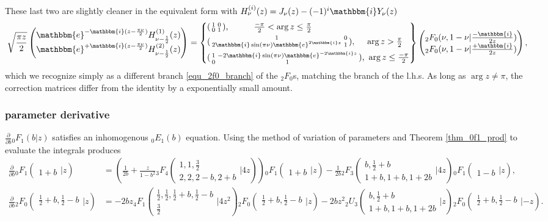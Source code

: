 \documentclass[12pt]{article}
\newcommand{\ee}[0] {\mathbbm{e}}
\newcommand{\ii}[0] {\mathbbm{i}}
\numberwithin{equation}{section}
\newcommand{\Head}[3] {{}_{#1}{#2}_{#3}}
\newcommand{\ArgS}[3] {( \begin{smallmatrix} #1 \\ #2 \end{smallmatrix} | {#3})}
\begin{document}
These last two are slightly cleaner in the equivalent form with $H_{\nu}^{(i)}(z) = J_{\nu}(z) - (-1)^i \ii Y_{\nu}(z)$
\begin{equation*}
\sqrt{\frac{\pi z}{2}} \begin{pmatrix}
\ee^{-\ii (z - \frac{\pi \nu}{2})}H_{\nu-\frac{1}{2}}^{(1)}(z)\\
\ee^{+\ii (z - \frac{\pi \nu}{2})}H_{\nu-\frac{1}{2}}^{(2)}(z)
\end{pmatrix}
=
\left\{
\begin{aligned}
&(\begin{smallmatrix} 1&0\\ 0 &1\end{smallmatrix})\text{,} \quad \quad \quad \tfrac{-\pi}{2} < \arg z \le \tfrac{\pi}{2}\\
&(\begin{smallmatrix} 1& 0\\ 2\ii \sin(\pi \nu) \ee^{2 \ii z} &1\end{smallmatrix})\text{, } \quad \arg z> \tfrac{\pi}{2}\\
&(\begin{smallmatrix} 1&-2\ii \sin(\pi \nu) \ee^{-2 \ii z}\\ 0  &1\end{smallmatrix})\text{, } \arg z \le \tfrac{-\pi}{2}
\end{aligned}
\right\}
\begin{pmatrix}
{}_2 F_0(\nu,1-\nu|\tfrac{-\ii}{2 z})\\
{}_2 F_0(\nu,1-\nu|\tfrac{+\ii}{2 z})
\end{pmatrix}\text{,}
\end{equation*}
which we recognize simply as a different branch \eqref{equ_2f0_branch} of the ${}_2 F_0$s, matching the branch of the l.h.s. As long as $\arg z \ne \pi$, the correction matrices differ from the identity by a exponentially small amount.

\subsubsection{parameter derivative}
$\frac{\partial}{\partial b} \Head{0}{F}{1}(b|z)$ satisfies an inhomogenous $\Head{0}{E}{1}(b)$ equation. Using the method of variation of parameters and Theorem \ref{thm_0f1_prod} to evaluate the integrals produces
\begin{align*}
\tfrac{\partial}{\partial b} \Head{0}{F}{1}\ArgS{}{1+b}{z} &= (\tfrac{1}{2 b} + \tfrac{z}{1-b^2} \Head{3}{F}{4}\ArgS{1,1,\frac32}{2,2,2-b,2+b}{4z})\Head{0}{F}{1}\ArgS{}{1+b}{z}-\tfrac{1}{2b}\Head{2}{F}{3}\ArgS{b,\frac12+b}{1+b,1+b,1+2 b}{4 z}\Head{0}{F}{1}\ArgS{}{1-b}{z}\text{,}\\
\tfrac{\partial}{\partial b} \Head{2}{F}{0}\ArgS{\frac12+b,\frac12-b}{}{z} &= -2 b z \Head{4}{F}{1} \ArgS{\frac12, \frac12, \frac12 +b, \frac12-b}{\frac32}{4 z^2} \Head{2}{F}{0} \ArgS{\frac12+b, \frac12-b}{}{z} - 2 b z^2 \Head{2}{U}{3}\ArgS{b,\frac12+b}{1+b, 1+b,1+2b}{z} \Head{2}{F}{0} \ArgS{\frac12+b,\frac12-b}{}{-z}\text{.}
\end{align*}
\end{document}
